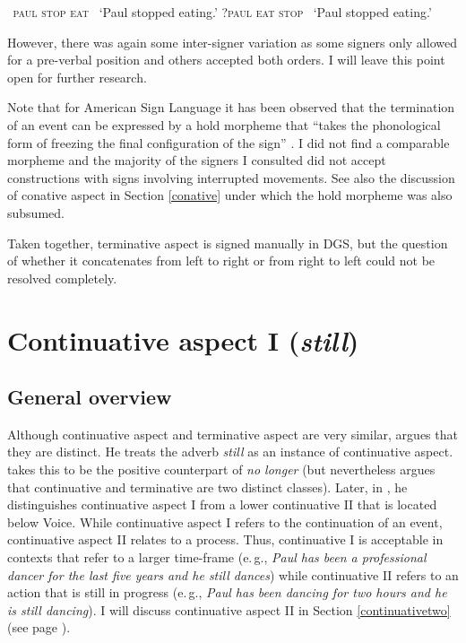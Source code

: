 \begin{exe}
\ex\label{ex:stopped}\begin{xlist} 
\ex
{\textcolor{white}{?}\textsc{paul stop eat}}      
\glt \textcolor{white}{*}`Paul stopped eating.' \label{ex:stoppeda}
\ex
{?\textsc{paul eat stop}}       
\glt \textcolor{white}{?}`Paul stopped eating.' \label{ex:stoppedb}
\end{xlist}
\end{exe}

\noindent However, there was again some inter-signer variation as some signers only allowed for a pre-verbal position and others accepted both orders. I will leave this point open for further research. 

Note that for American Sign Language it has been observed that the termination of an event can be expressed by a hold morpheme \citep{brentari1998prosodic, wilbur2000when, rathmann2005event} that ``takes the phonological form of freezing the final configuration of the sign'' \citep[43]{rathmann2005event}. I did not find a comparable morpheme and the majority of the signers I consulted did not accept constructions with signs involving interrupted movements. See also the discussion of conative aspect in Section \ref{conative} under which the hold morpheme was also subsumed.

Taken together, terminative aspect is signed manually in DGS, but the question of whether it concatenates from left to right or from right to left could not be resolved completely. 



\section{Continuative aspect I (\textit{still})}\label{continuativeone}
\subsection{General overview}
Although continuative aspect and terminative aspect are very similar, \citet[95]{cinque1999adverbs} argues that they are distinct. He treats the adverb \textit{still} as an instance of continuative aspect. \citet{cinque1999adverbs} takes this to be the positive counterpart of \textit{no longer} (but nevertheless argues that continuative and terminative are two distinct classes). Later, in \citet{cinque2006restructuring}, he distinguishes continuative aspect I from a lower continuative II  that is located below Voice. While continuative aspect I refers to the continuation of an event, continuative aspect II relates to a process. Thus, continuative I is acceptable in contexts that refer to a larger time-frame (e.\,g., \textit{Paul has been a professional dancer for the last five years and he still dances}) while continuative II refers to an action that is still in progress (e.\,g., \textit{Paul has been dancing for two hours and he is still dancing}). I will discuss continuative aspect II in Section \ref{continuativetwo} (see page \pageref{continuativetwo}).

